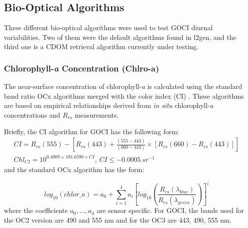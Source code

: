\documentclass[onecolumn,3p,letterpaper,11pt]{elsarticle}
\begin{document}
\subsection{Bio-Optical Algorithms} \label{subsec:bioopalg}
Three different bio-optical algorithms were used to test GOCI diurnal variabilities. Two of them were the default algorithms found in l2gen, and the third one is a CDOM retrieval algorithm currently under testing.
\subsubsection{Chlorophyll-{\it a} Concentration (Chlro-a)}
The near-surface concentration of chlorophyll-{\it a} is calculated using the standard band ratio OCx \citep{OReilly2000} algorithms merged with the color index (CI) \citep{Hu2012}. These algorithms are based on empirical relationships derived from {\it in situ} chlorophyll-{\it a} concentrations and $R_{rs}$ measurements. 

Briefly, the CI algorithm for GOCI has the following form:
\begin{equation}
\begin{split}
  CI=R_{rs}(555)-\left[R_{rs}(443)+\frac{(555-443)}{(660-443)}\times [R_{rs}(660)-R_{rs}(443)]\right]\\
  Chl_{CI} = 10^{0.4909+191.6590\times CI},~CI\leq-0.0005~sr^{-1}
\end{split}  
\end{equation}
\noindent and the standard OCx algorithm has the form: 

\begin{equation}
  log_{10}(chlor\_a) = a_0 + \sum_{i=1}^4 a_i \left[log_{10}\left(\frac{R_{rs}(\lambda_{blue})}{R_{rs}(\lambda_{green})}\right)\right]^i
\end{equation}
where the coefficients $a_0,...,a_4$ are sensor specific. For GOCI, the bands used for the OC2 version are 490 and 555 nm and for the OC3 are 443, 490, 555 nm.
\end{document}
